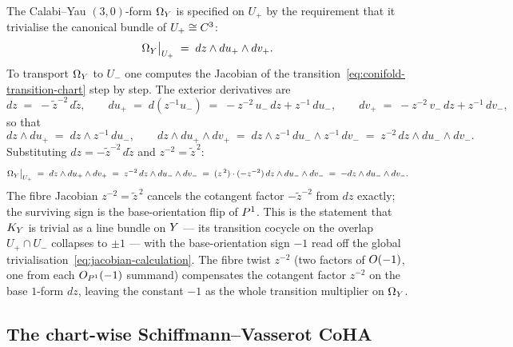 The Calabi--Yau $(3,0)$-form $\Omega_{Y}$ is specified on $U_+$ by the
requirement that it trivialise the canonical bundle of $U_+ \cong C^3$:
\[
  \Omega_{Y}\big|_{U_+} \;=\; dz \wedge du_+ \wedge dv_+.
\]
To transport $\Omega_{Y}$ to $U_-$ one computes the Jacobian of the
transition~\eqref{eq:conifold-transition-chart} step by step.  The exterior
derivatives are
\[
  dz \;=\; -\tilde z^{-2}\, d\tilde z,
  \qquad
  du_+ \;=\; d(z^{-1} u_-)
          \;=\; -z^{-2}\, u_-\, dz + z^{-1}\, du_-,
  \qquad
  dv_+ \;=\; -z^{-2}\, v_-\, dz + z^{-1}\, dv_-,
\]
so that
\[
  dz \wedge du_+ \;=\; dz \wedge z^{-1}\, du_-,
  \qquad
  dz \wedge du_+ \wedge dv_+ \;=\; dz \wedge z^{-1}\, du_- \wedge z^{-1}\, dv_-
  \;=\; z^{-2}\, dz \wedge du_- \wedge dv_-.
\]
Substituting $dz = -\tilde z^{-2}\, d\tilde z$ and $z^{-2} = \tilde z^{\,2}$:
\begin{equation}\label{eq:jacobian-calculation}
  \Omega_{Y}\big|_{U_+}
  \;=\; dz \wedge du_+ \wedge dv_+
  \;=\; z^{-2}\, dz \wedge du_- \wedge dv_-
  \;=\; (z^{\,2}) \cdot (-z^{-2})\, dz \wedge du_- \wedge dv_-
  \;=\; -dz \wedge du_- \wedge dv_-.
\end{equation}
The fibre Jacobian $z^{-2} = \tilde z^{\,2}$ cancels the cotangent factor
$-\tilde z^{-2}$ from $dz$ exactly; the surviving sign is the
base-orientation flip of $P^1$.  This is the statement that $K_{Y}$
is trivial as a line bundle on $Y$ --- its transition cocycle on the
overlap $U_+ \cap U_-$ collapses to $\pm 1$ --- with the base-orientation
sign $-1$ read off the global trivialisation~\eqref{eq:jacobian-calculation}.
The fibre twist $z^{-2}$ (two factors of $O(-1)$, one from each
$O_{P^1}(-1)$ summand) compensates the cotangent factor $z^{-2}$ on
the base $1$-form $dz$, leaving the constant $-1$ as the whole transition
multiplier on $\Omega_{Y}$.

\subsection{The chart-wise Schiffmann--Vasserot CoHA}

